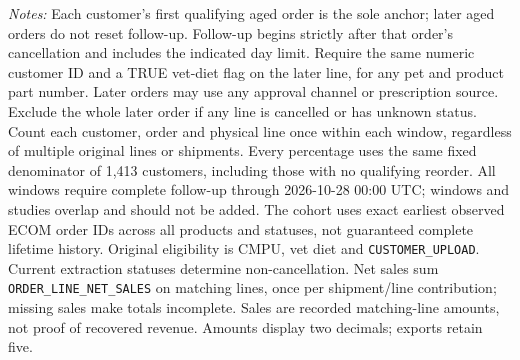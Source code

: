 \begin{table}[!htbp]
\begin{minipage}{\linewidth}
\footnotesize
\textit{Notes:} Each customer's first qualifying aged order is the sole anchor;
later aged orders do not reset follow-up. Follow-up begins strictly after that
order's cancellation and includes the indicated day limit. Require the same numeric customer ID and a TRUE vet-diet flag on the later line, for any pet and product part number. Later orders may use any approval channel or prescription
source. Exclude the whole later order if any line is cancelled or has unknown
status. Count each customer, order and physical line once within each window,
regardless of multiple original lines or shipments. Every percentage uses the
same fixed denominator of 1,413 customers, including those with no
qualifying reorder. All windows require complete follow-up through
2026-10-28 00:00 UTC; windows and studies overlap and should not be added.
The cohort uses exact earliest observed ECOM order IDs across all products and statuses, not guaranteed complete lifetime history. Original eligibility is CMPU,
vet diet and \texttt{CUSTOMER\_UPLOAD}. Current extraction statuses determine
non-cancellation. Net sales sum \texttt{ORDER\_LINE\_NET\_SALES} on matching
lines, once per shipment/line contribution; missing sales make totals incomplete.
Sales are recorded matching-line amounts, not proof of recovered revenue.
Amounts display two decimals; exports retain five.
\end{minipage}
\end{table}
